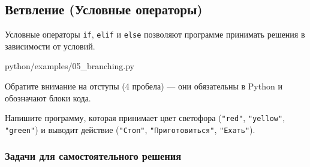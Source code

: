 \subsection{Ветвление (Условные операторы)}

Условные операторы \texttt{if}, \texttt{elif} и \texttt{else} позволяют программе принимать решения в зависимости от условий.

\begin{codefile}[python]{python/examples/05_branching.py}
\end{codefile}

Обратите внимание на отступы (4 пробела) — они обязательны в Python и обозначают блоки кода.

\begin{taskbox}[Светофор]
Напишите программу, которая принимает цвет светофора (\texttt{"red"}, \texttt{"yellow"}, \texttt{"green"}) и выводит действие (\texttt{"Стоп"}, \texttt{"Приготовиться"}, \texttt{"Ехать"}).
\end{taskbox}

\subsubsection*{Задачи для самостоятельного решения}

